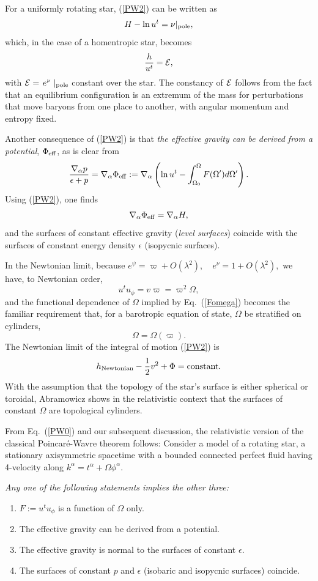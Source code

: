 \documentclass[12pt]{article}
\def\a{\alpha}
\def\be{\begin{equation}}
\def\ee{\end{equation}}
\def\a{\alpha}
\begin{document}
For a uniformly rotating star, (\ref{PW2}) can be written as
\be
H-\ln u^t = \nu|_{\rm pole},
\ee
which, in the case of a homentropic star, becomes
\be 
        \frac{h}{u^t} = {\cal E},
\label{calE}
\ee 
with ${\cal E}=\left.e^\nu\right.|_{\rm pole}$ constant over the star.  The constancy of $\cal E$ follows from the 
fact that an equilibrium configuration is an extremum of the mass 
for perturbations that move baryons from one place to another, 
with angular momentum and entropy fixed.  
  
Another consequence of (\ref{PW2}) is that {\it the effective gravity can be 
derived from a potential}, $\Phi_{\rm eff}$, as is clear from
\be
\frac{\nabla_\a p}{\epsilon+p} = \nabla_\a \Phi_{\rm eff} :=
\nabla_\a\left( \ln u^t - \int_{\Omega_0}^\Omega F(\Omega') d\Omega'\right).
\ee
Using (\ref{PW2}), one finds
\be
\nabla_\a \Phi_{\rm eff} = \nabla_\a H,
\ee
and the surfaces of constant effective gravity ({\it level surfaces}) coincide
with the surfaces of constant energy density $\epsilon$ (isopycnic surfaces).
 
In the Newtonian limit, because 
$\displaystyle
e^\psi = \varpi + O(\lambda^2), \quad e^\nu = 1+O(\lambda^2),
$
we have, to Newtonian order,
\be 
u^t u_\phi = v\varpi = \varpi^2\Omega, 
\ee
and the functional dependence of $\Omega$ implied by Eq.~(\ref{Fomega})
becomes the familiar requirement that, for a barotropic equation of state,
$\Omega$ be stratified on cylinders, 
\be
\Omega = \Omega(\varpi).
\ee 
The Newtonian limit of the integral of motion (\ref{PW2}) is 
\be
   h_{\rm Newtonian} -\frac12 v^2 + \Phi = \mbox{constant} 
\label{eq:eulernewt}.\ee 
With the assumption that the topology of the star's surface is either 
spherical or toroidal, Abramowicz \cite{abramowicz74} shows in the 
relativistic context that the surfaces of constant $\Omega$ are 
topological cylinders.   

   From Eq.~(\ref{PW0}) and our subsequent discussion, the relativistic 
version of the classical Poincar\'e-Wavre theorem \cite{Tassoul78} follows:
Consider a model of a rotating star, a stationary axisymmetric spacetime with a 
bounded connected perfect fluid having 4-velocity along $k^\a = t^\a+\Omega\phi^\a$.\\
{\it Any one of the following statements implies the other 
three:
\begin{enumerate}
\item $F:=u^t u_\phi$ is a function of $\Omega$ only.
\item The effective gravity can be derived from a potential.
\item The effective gravity is normal to the surfaces of constant $\epsilon$.
\item The surfaces of constant $p$ and $\epsilon$ (isobaric and isopycnic surfaces) coincide.
\end{enumerate}
}  
\end{document}

